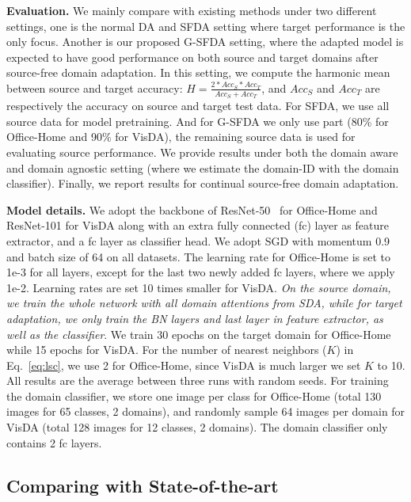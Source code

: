 \documentclass[10pt,twocolumn,letterpaper]{article}
\begin{document}
\noindent \textbf{Evaluation.} We mainly compare with existing methods under two different settings, one is the normal DA and SFDA setting where target performance is the only focus. Another is our proposed G-SFDA setting, where the adapted model is expected to have good performance on both source and target domains after source-free domain adaptation. In this setting, we compute the harmonic mean between source and target accuracy: $H=\frac{2*Acc_S*Acc_T}{Acc_S+Acc_T}$, and $Acc_S$ and $Acc_T$ are respectively the accuracy on source and target test data. For SFDA, we use all source data for model pretraining. And for G-SFDA we only use part (80\% for Office-Home and 90\% for VisDA), the remaining source data is used for evaluating source performance. We provide results under both the domain aware and domain agnostic setting (where we estimate the domain-ID with the domain classifier). Finally, we report results for continual source-free domain adaptation.



\noindent \textbf{Model details.} We adopt the backbone of ResNet-50~\cite{he2016deep} for Office-Home and  ResNet-101 for VisDA along with an extra fully connected (fc) layer as feature extractor, and a fc layer as classifier head. We adopt SGD with momentum 0.9 and batch size of 64 on all datasets. The learning rate for Office-Home is set to 1e-3 for all layers, except for the last two newly added fc layers, where we apply 1e-2. Learning rates are set 10 times smaller for VisDA. \textit{On the source domain, we train the whole network with all domain attentions from SDA, while for target adaptation, we only train the BN layers and last layer in feature extractor, as well as the classifier}. We train 30 epochs on the target domain for Office-Home while 15 epochs for VisDA. For the number of nearest neighbors ($K$) in Eq.~\ref{eq:lsc}, we use 2 for Office-Home, since VisDA is much larger we set $K$ to 10. All results are the average between three runs with random seeds. For training the domain classifier, we store one image per class for Office-Home (total 130 images for 65 classes, 2 domains), and randomly sample 64 images per domain for VisDA (total 128 images for 12 classes, 2 domains). The domain classifier only contains 2 fc layers. 

\subsection{Comparing with State-of-the-art}
\end{document}
